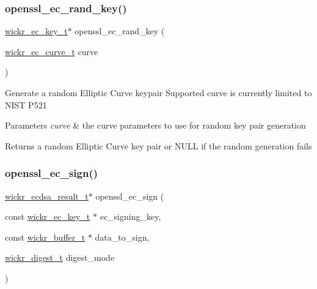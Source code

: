 \subsubsection{\texorpdfstring{openssl\+\_\+ec\+\_\+rand\+\_\+key()}{openssl\_ec\_rand\_key()}}
{\footnotesize\ttfamily \mbox{\hyperlink{structwickr__ec__key}{wickr\+\_\+ec\+\_\+key\+\_\+t}}$\ast$ openssl\+\_\+ec\+\_\+rand\+\_\+key (\begin{DoxyParamCaption}\item[{\mbox{\hyperlink{structwickr__ec__curve}{wickr\+\_\+ec\+\_\+curve\+\_\+t}}}]{curve }\end{DoxyParamCaption})}

Generate a random Elliptic Curve keypair Supported curve is currently limited to N\+I\+ST P521


\begin{DoxyParams}{Parameters}
{\em curve} & the curve parameters to use for random key pair generation \\
\hline
\end{DoxyParams}
\begin{DoxyReturn}{Returns}
a random Elliptic Curve key pair or N\+U\+LL if the random generation fails 
\end{DoxyReturn}
\mbox{\label{group__openssl__crypto_gab32cef5c789ee1992afae98a81b65823}} 
\subsubsection{\texorpdfstring{openssl\+\_\+ec\+\_\+sign()}{openssl\_ec\_sign()}}
{\footnotesize\ttfamily \mbox{\hyperlink{structwickr__ecdsa__result}{wickr\+\_\+ecdsa\+\_\+result\+\_\+t}}$\ast$ openssl\+\_\+ec\+\_\+sign (\begin{DoxyParamCaption}\item[{const \mbox{\hyperlink{structwickr__ec__key}{wickr\+\_\+ec\+\_\+key\+\_\+t}} $\ast$}]{ec\+\_\+signing\+\_\+key,  }\item[{const \mbox{\hyperlink{structwickr__buffer}{wickr\+\_\+buffer\+\_\+t}} $\ast$}]{data\+\_\+to\+\_\+sign,  }\item[{\mbox{\hyperlink{structwickr__digest}{wickr\+\_\+digest\+\_\+t}}}]{digest\+\_\+mode }\end{DoxyParamCaption})}

